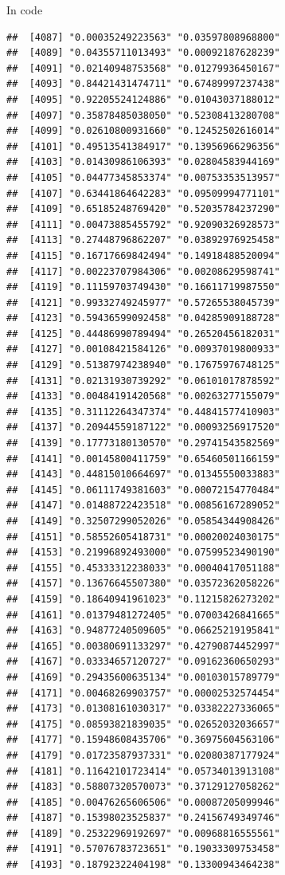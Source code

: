 \documentclass[ignorenonframetext,]{beamer}
\begin{document}
\begin{frame}[fragile]{In code}
\begin{verbatim}
##  [4087] "0.00035249223563" "0.03597808968800"
##  [4089] "0.04355711013493" "0.00092187628239"
##  [4091] "0.02140948753568" "0.01279936450167"
##  [4093] "0.84421431474711" "0.67489997237438"
##  [4095] "0.92205524124886" "0.01043037188012"
##  [4097] "0.35878485038050" "0.52308413280708"
##  [4099] "0.02610800931660" "0.12452502616014"
##  [4101] "0.49513541384917" "0.13956966296356"
##  [4103] "0.01430986106393" "0.02804583944169"
##  [4105] "0.04477345853374" "0.00753353513957"
##  [4107] "0.63441864642283" "0.09509994771101"
##  [4109] "0.65185248769420" "0.52035784237290"
##  [4111] "0.00473885455792" "0.92090326928573"
##  [4113] "0.27448796862207" "0.03892976925458"
##  [4115] "0.16717669842494" "0.14918488520094"
##  [4117] "0.00223707984306" "0.00208629598741"
##  [4119] "0.11159703749430" "0.16611719987550"
##  [4121] "0.99332749245977" "0.57265538045739"
##  [4123] "0.59436599092458" "0.04285909188728"
##  [4125] "0.44486990789494" "0.26520456182031"
##  [4127] "0.00108421584126" "0.00937019800933"
##  [4129] "0.51387974238940" "0.17675976748125"
##  [4131] "0.02131930739292" "0.06101017878592"
##  [4133] "0.00484191420568" "0.00263277155079"
##  [4135] "0.31112264347374" "0.44841577410903"
##  [4137] "0.20944559187122" "0.00093256917520"
##  [4139] "0.17773180130570" "0.29741543582569"
##  [4141] "0.00145800411759" "0.65460501166159"
##  [4143] "0.44815010664697" "0.01345550033883"
##  [4145] "0.06111749381603" "0.00072154770484"
##  [4147] "0.01488722423518" "0.00856167289052"
##  [4149] "0.32507299052026" "0.05854344908426"
##  [4151] "0.58552605418731" "0.00020024030175"
##  [4153] "0.21996892493000" "0.07599523490190"
##  [4155] "0.45333312238033" "0.00040417051188"
##  [4157] "0.13676645507380" "0.03572362058226"
##  [4159] "0.18640941961023" "0.11215826273202"
##  [4161] "0.01379481272405" "0.07003426841665"
##  [4163] "0.94877240509605" "0.06625219195841"
##  [4165] "0.00380691133297" "0.42790874452997"
##  [4167] "0.03334657120727" "0.09162360650293"
##  [4169] "0.29435600635134" "0.00103015789779"
##  [4171] "0.00468269903757" "0.00002532574454"
##  [4173] "0.01308161030317" "0.03382227336065"
##  [4175] "0.08593821839035" "0.02652032036657"
##  [4177] "0.15948608435706" "0.36975604563106"
##  [4179] "0.01723587937331" "0.02080387177924"
##  [4181] "0.11642101723414" "0.05734013913108"
##  [4183] "0.58807320570073" "0.37129127058262"
##  [4185] "0.00476265606506" "0.00087205099946"
##  [4187] "0.15398023525837" "0.24156749349746"
##  [4189] "0.25322969192697" "0.00968816555561"
##  [4191] "0.57076783723651" "0.19033309753458"
##  [4193] "0.18792322404198" "0.13300943464238"

\end{verbatim}
\end{frame}
\end{document}
